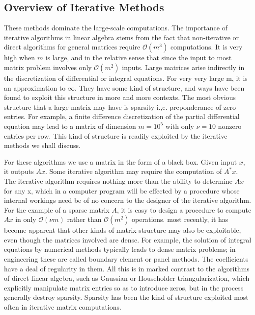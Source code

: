 \documentclass[12pt, oneside]{book}
\theoremstyle{definition}
\theoremstyle{definition}
\theoremstyle{remark}
\begin{document}
\subsection{Overview of Iterative Methods}
These methods dominate the large-scale computations. The importance of iterative algorithms in linear algebra stems from the fact that non-iterative or direct algorithms for general matrices require $\mathcal{O}(m^3)$ computations. It is very high when $m$ is large, and in the relative sense that since the input to most matrix problem involves only $\mathcal{O}(m^2)$ inputs. Large matrices arise indirectly in the discretization of differential or integral equations. For very very large m, it is an approximation to $\infty$.  They have some kind of structure, and ways have been found to exploit this structure in more and more contexts. The most obvious structure that a large matrix may have is sparsity i.,e. preponderance of zero entries. For example, a finite difference discretization of the partial differential equation may lead to a matrix of dimension $m=10^5$ with only $\nu =10$ nonzero entries per row. This kind of structure is readily exploited by the iterative methods we shall discuss. 

For these algorithms we use a matrix in the form of a black box. Given input $x$, it outputs $Ax$. Some iterative algorithm may require the computation of $A^*x$. The iterative algorithm requires nothing more than the ability to determine $Ax$ for any x, which in a computer program will be effected by a procedure whose internal workings need be of no concern to the designer of the iterative algorithm. For the example of a sparse matrix $A$, it is easy to design a procedure to compute $Ax$ in only $\mathcal{O}(\nu m)$ rather than $\mathcal{O}(m^2)$ operations. most recently, it has become apparent that other kinds of matrix structure may also be exploitable, even though the matrices involved are dense. For example, the solution of integral equations by numerical methods typically leads to dense matrix problems; in engineering these are called boundary element or panel methods. The coefficients have a deal of regularity in them. All this is in marked contrast to the algorithms of direct linear algebra, such as Gaussian or Householder triangularization, which explicitly manipulate matrix entries so as to introduce zeros, but in the process generally destroy sparsity. Sparsity has been the kind of structure exploited most often in iterative matrix computations.
\end{document}
